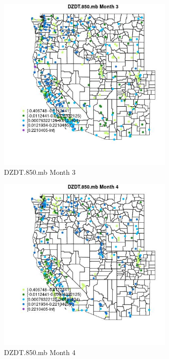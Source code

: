\begin{figure} 
\centering  
\includegraphics[width=0.77\textwidth]{Code_Outputs/Report_ML_input_PM25_Step4_part_e_de_duplicated_aves_compiled_2019-05-18wNAs_MapObsMo3DZDT850mb.jpg} 
\caption{\label{fig:Report_ML_input_PM25_Step4_part_e_de_duplicated_aves_compiled_2019-05-18wNAsMapObsMo3DZDT850mb}DZDT.850.mb Month 3} 
\end{figure} 
 

\begin{figure} 
\centering  
\includegraphics[width=0.77\textwidth]{Code_Outputs/Report_ML_input_PM25_Step4_part_e_de_duplicated_aves_compiled_2019-05-18wNAs_MapObsMo4DZDT850mb.jpg} 
\caption{\label{fig:Report_ML_input_PM25_Step4_part_e_de_duplicated_aves_compiled_2019-05-18wNAsMapObsMo4DZDT850mb}DZDT.850.mb Month 4} 
\end{figure} 
 

